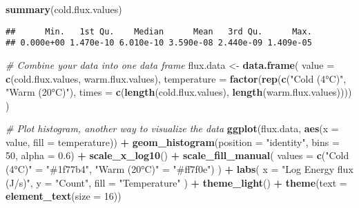 \documentclass[
]{article}
\newenvironment{Shaded}{\begin{snugshade}}{\end{snugshade}}
\newcommand{\AttributeTok}[1]{\textcolor[rgb]{0.13,0.29,0.53}{#1}}
\newcommand{\CommentTok}[1]{\textcolor[rgb]{0.56,0.35,0.01}{\textit{#1}}}
\newcommand{\DecValTok}[1]{\textcolor[rgb]{0.00,0.00,0.81}{#1}}
\newcommand{\FloatTok}[1]{\textcolor[rgb]{0.00,0.00,0.81}{#1}}
\newcommand{\FunctionTok}[1]{\textcolor[rgb]{0.13,0.29,0.53}{\textbf{#1}}}
\newcommand{\NormalTok}[1]{#1}
\newcommand{\OtherTok}[1]{\textcolor[rgb]{0.56,0.35,0.01}{#1}}
\newcommand{\SpecialCharTok}[1]{\textcolor[rgb]{0.81,0.36,0.00}{\textbf{#1}}}
\newcommand{\StringTok}[1]{\textcolor[rgb]{0.31,0.60,0.02}{#1}}
\begin{document}
\begin{Shaded}
\begin{Highlighting}[]
\FunctionTok{summary}\NormalTok{(cold.flux.values)}
\end{Highlighting}
\end{Shaded}

\begin{verbatim}
##      Min.   1st Qu.    Median      Mean   3rd Qu.      Max. 
## 0.000e+00 1.470e-10 6.010e-10 3.590e-08 2.440e-09 1.409e-05
\end{verbatim}

\begin{Shaded}
\begin{Highlighting}[]
\CommentTok{\# Combine your data into one data frame}
\NormalTok{flux.data }\OtherTok{\textless{}{-}} \FunctionTok{data.frame}\NormalTok{(}
  \AttributeTok{value =} \FunctionTok{c}\NormalTok{(cold.flux.values, warm.flux.values),}
  \AttributeTok{temperature =} \FunctionTok{factor}\NormalTok{(}\FunctionTok{rep}\NormalTok{(}\FunctionTok{c}\NormalTok{(}\StringTok{"Cold (4°C)"}\NormalTok{, }\StringTok{"Warm (20°C)"}\NormalTok{), }
                           \AttributeTok{times =} \FunctionTok{c}\NormalTok{(}\FunctionTok{length}\NormalTok{(cold.flux.values), }\FunctionTok{length}\NormalTok{(warm.flux.values))))}
\NormalTok{)}

\CommentTok{\# Plot histogram, another way to visualize the data}
\FunctionTok{ggplot}\NormalTok{(flux.data, }\FunctionTok{aes}\NormalTok{(}\AttributeTok{x =}\NormalTok{ value, }\AttributeTok{fill =}\NormalTok{ temperature)) }\SpecialCharTok{+}
  \FunctionTok{geom\_histogram}\NormalTok{(}\AttributeTok{position =} \StringTok{"identity"}\NormalTok{, }\AttributeTok{bins =} \DecValTok{50}\NormalTok{, }\AttributeTok{alpha =} \FloatTok{0.6}\NormalTok{) }\SpecialCharTok{+}
  \FunctionTok{scale\_x\_log10}\NormalTok{() }\SpecialCharTok{+} 
  \FunctionTok{scale\_fill\_manual}\NormalTok{(}
    \AttributeTok{values =} \FunctionTok{c}\NormalTok{(}\StringTok{"Cold (4°C)"} \OtherTok{=} \StringTok{"\#1f77b4"}\NormalTok{,  }
               \StringTok{"Warm (20°C)"} \OtherTok{=} \StringTok{"\#ff7f0e"}\NormalTok{)}
\NormalTok{  ) }\SpecialCharTok{+}
  \FunctionTok{labs}\NormalTok{(}
    \AttributeTok{x =} \StringTok{"Log Energy flux (J/s)"}\NormalTok{,}
    \AttributeTok{y =} \StringTok{"Count"}\NormalTok{,}
    \AttributeTok{fill =} \StringTok{"Temperature"}
\NormalTok{  ) }\SpecialCharTok{+}
  \FunctionTok{theme\_light}\NormalTok{() }\SpecialCharTok{+}
  \FunctionTok{theme}\NormalTok{(}\AttributeTok{text =} \FunctionTok{element\_text}\NormalTok{(}\AttributeTok{size =} \DecValTok{16}\NormalTok{))}
\end{Highlighting}
\end{Shaded}
\end{document}
